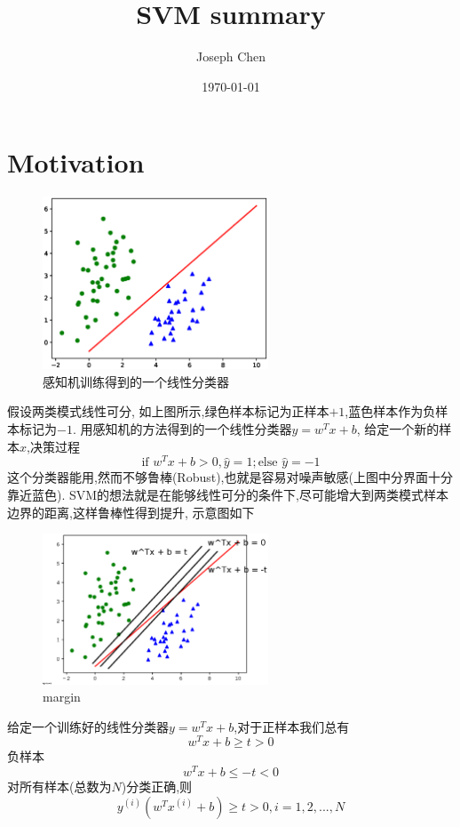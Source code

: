 \documentclass[12pt,letterpaper]{article}
\author{Joseph  Chen}
\title{SVM summary}
\date{\today}
\begin{document}
\maketitle

\section{Motivation}
  \begin{figure}[H]
	\centering
	\includegraphics[width=0.6\textwidth, height=0.3\textheight]{linear_sp1}
	\caption{感知机训练得到的一个线性分类器}
  \end{figure}
假设两类模式线性可分, 如上图所示,绿色样本标记为正样本$+1$,蓝色样本作为负样本标记为$-1$. 用感知机的方法得到的一个线性分类器$y= w^Tx+b$, 给定一个新的样本$x$,决策过程
\[
	\text{if }w^Tx + b > 0 , \hat{y} = 1;\text{else } \hat{y} = -1
\]
这个分类器能用,然而不够鲁棒(Robust),也就是容易对噪声敏感(上图中分界面十分靠近蓝色).
SVM的想法就是在能够线性可分的条件下,尽可能增大到两类模式样本边界的距离,这样鲁棒性得到提升,
示意图如下
  \begin{figure}[H]
  	\centering
  	\includegraphics[width=0.6\textwidth, height=0.3\textheight]{linear_sp2}
  	\caption{margin}
  \end{figure}
  给定一个训练好的线性分类器$y=w^Tx+b$,对于正样本我们总有
  \[
	  w^Tx+b \geq  t > 0
  \]
 负样本
 \[
	 w^Tx + b \leq  -t < 0
 \]
 对所有样本(总数为$N$)分类正确,则
 \[
	 y^{(i)}(w^Tx^{(i)}+b) \geq t > 0 , i = 1,2,...,N
 \]
\end{document}
